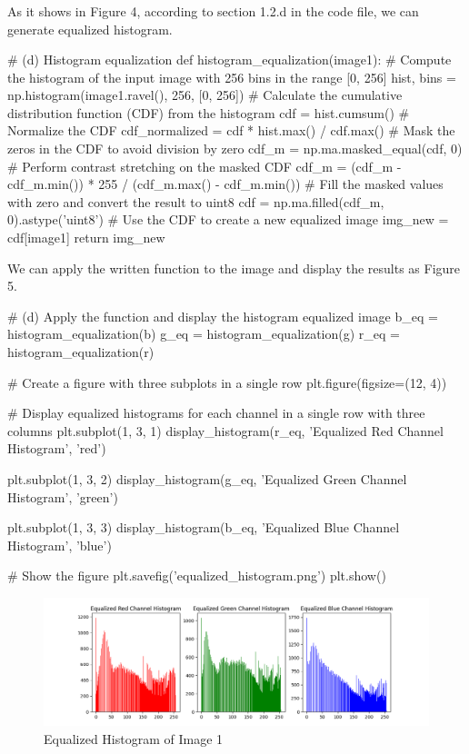 \documentclass[12pt]{article}
\begin{document}
\subsubsection{}
\quad As it shows in Figure 4, according to section 1.2.d in the code file, we can generate equalized histogram.
\begin{python}
  # (d) Histogram equalization
  def histogram_equalization(image1):
  # Compute the histogram of the input image with 256 bins in the range [0, 256]
  hist, bins = np.histogram(image1.ravel(), 256, [0, 256])
  # Calculate the cumulative distribution function (CDF) from the histogram
  cdf = hist.cumsum()
  # Normalize the CDF
  cdf_normalized = cdf * hist.max() / cdf.max()
  # Mask the zeros in the CDF to avoid division by zero
  cdf_m = np.ma.masked_equal(cdf, 0)
  # Perform contrast stretching on the masked CDF
  cdf_m = (cdf_m - cdf_m.min()) * 255 / (cdf_m.max() - cdf_m.min())
  # Fill the masked values with zero and convert the result to uint8
  cdf = np.ma.filled(cdf_m, 0).astype('uint8')
  # Use the CDF to create a new equalized image
  img_new = cdf[image1]
  return img_new
\end{python}
\quad We can apply the written function to the image and display the results as Figure 5.
\begin{python}
  # (d) Apply the function and display the histogram equalized image
  b_eq = histogram_equalization(b)
  g_eq = histogram_equalization(g)
  r_eq = histogram_equalization(r)

  # Create a figure with three subplots in a single row
  plt.figure(figsize=(12, 4))

  # Display equalized histograms for each channel in a single row with three columns
  plt.subplot(1, 3, 1)
  display_histogram(r_eq, 'Equalized Red Channel Histogram', 'red')

  plt.subplot(1, 3, 2)
  display_histogram(g_eq, 'Equalized Green Channel Histogram', 'green')

  plt.subplot(1, 3, 3)
  display_histogram(b_eq, 'Equalized Blue Channel Histogram', 'blue')

  # Show the figure
  plt.savefig('equalized_histogram.png')
  plt.show()
\end{python}

\begin{figure}[H]
  \centering
  \includegraphics[width=1.0\textwidth]{equalized_histogram.png}
  \caption{Equalized Histogram of Image 1}
  \label{fig:example}
\end{figure}
\end{document}
